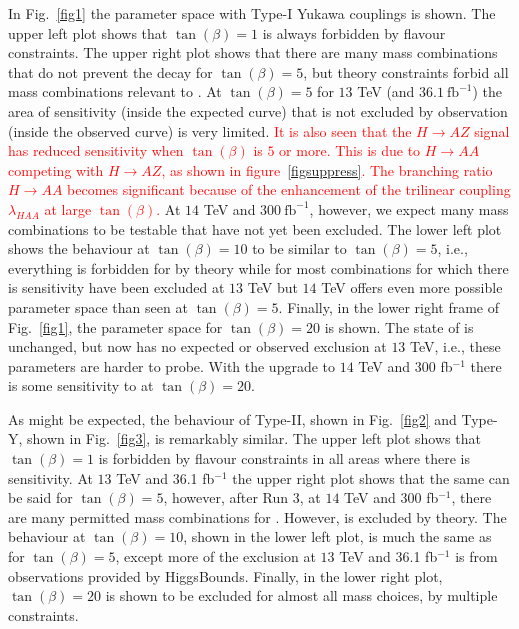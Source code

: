 In Fig.~\ref{fig1} the parameter space with Type-I Yukawa couplings is shown.
The upper left plot shows that \(\tan(\beta) = 1\) is always forbidden by flavour constraints.
The upper right plot shows that there are many mass combinations that do not prevent the decay \AZH{} for \(\tan(\beta) = 5\),
but theory constraints forbid all mass combinations relevant to \HZA{}.
At \(\tan(\beta) = 5\) for \(13\) TeV (and \(36.1~\text{fb}^{-1}\)) the area of sensitivity (inside the expected curve) that is not excluded by observation (inside the observed curve) is very limited. 
\textcolor{red}{It is also seen that the \(H\rightarrow AZ\) signal has reduced sensitivity when \(\tan(\beta)\) is \(5\) or more.
This is due to \(H\rightarrow AA\) competing with \(H\rightarrow AZ\), as shown in figure~\ref{figsuppress}.
The branching ratio \(H\rightarrow AA\) becomes significant because of the enhancement of the trilinear coupling \(\lambda_{HAA}\) at large \(\tan(\beta)\).}
At \(14\) TeV and \(300~\text{fb}^{-1}\), however, we expect many mass combinations to be testable that have not yet been excluded.
The lower left plot shows the behaviour at \(\tan(\beta) = 10\) to be similar to \(\tan(\beta) = 5\), i.e., 
everything is forbidden for \HZA{} by theory while for \AZH{} most combinations for which there is sensitivity have been excluded at \(13\) TeV
but \(14\) TeV offers even more possible parameter space than seen at \(\tan(\beta) = 5\).
Finally, in the lower right frame of Fig.~\ref{fig1}, the parameter space for \(\tan(\beta) = 20\) is shown.
The state of \HZA{} is unchanged, but now \AZH{} has no expected or observed exclusion at \(13\) TeV, i.e., these parameters are harder to probe.
With the upgrade to \(14\) TeV and 300 fb$^{-1}$ there is some sensitivity to \AZH{} at \(\tan(\beta) = 20\).

As might be expected, the behaviour of Type-II, shown in Fig.~\ref{fig2} and Type-Y, shown in Fig.~\ref{fig3}, is remarkably similar.
The upper left plot shows that \(\tan(\beta) = 1\) is forbidden by flavour constraints in all areas where there is sensitivity.
At \(13\) TeV  and 36.1 fb$^{-1}$ the upper right plot shows that the same can be said for \(\tan(\beta) = 5\), however,
after Run 3,  at \(14\) TeV and 300 fb$^{-1}$, there are many permitted mass combinations for \AZH{}. However, 
\HZA{} is excluded by theory.
The behaviour at \(\tan(\beta) = 10\), shown in the lower left plot, is much the same as for \(\tan(\beta) = 5\),
except more of the exclusion at \(13\) TeV and 36.1 fb$^{-1}$  is from observations provided by HiggsBounds.
Finally, in the lower right plot, \(\tan(\beta) = 20\) is shown to be excluded for almost all mass choices,
by multiple constraints.

